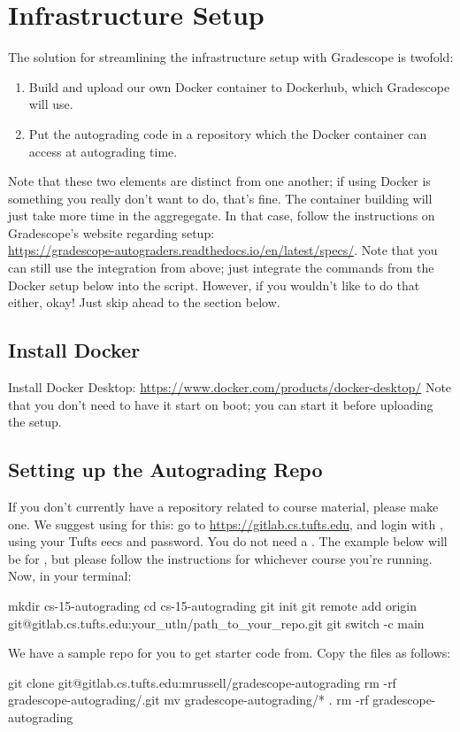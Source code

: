 \documentclass[11pt]{report}
\begin{document}
\chapter*{Infrastructure Setup}
The solution for streamlining the infrastructure setup with Gradescope is twofold:
\begin{enumerate}
      \item Build and upload our own Docker container to Dockerhub, which Gradescope will use.
      \item Put the autograding code in a  repository which the Docker container can access at autograding time. 
\end{enumerate}
Note that these two elements are distinct from one another; if using Docker is something you really don't want to do, that's fine. The container building 
will just take more time in the aggregegate. In that case, follow the instructions on Gradescope's website regarding 
setup:\\ \textcolor{blue}{\href{https://gradescope-autograders.readthedocs.io/en/latest/specs/}{https://gradescope-autograders.readthedocs.io/en/latest/specs/}}.
Note that you can still use the  integration from above; just integrate the  commands 
from the Docker setup below into the  script. However, if you wouldn't like to do that either, okay! Just skip ahead to the  section below. 

\section*{Install Docker}
Install Docker Desktop: \textcolor{blue}{\href{https://www.docker.com/products/docker-desktop/}{https://www.docker.com/products/docker-desktop/}}
Note that you don't need to have it start on boot; you can start it before uploading the setup. 

\section*{Setting up the Autograding Repo}
If you don't currently have a repository related to course material, please make one. We suggest using
 for this: go to \textcolor{blue}{\href{https://gitlab.cs.tufts.edu}{https://gitlab.cs.tufts.edu}}, and 
login with , using your Tufts eecs  and password. You do not need a .
The example below will be for , but please follow the instructions for whichever course you're running.
Now, in your terminal:
\begin{bashcodeblock}
mkdir cs-15-autograding
cd cs-15-autograding
git init
git remote add origin git@gitlab.cs.tufts.edu:your_utln/path_to_your_repo.git
git switch -c main 
\end{bashcodeblock}
We have a sample repo for you to get starter code from. Copy the files as follows:
\begin{bashcodeblock}
git clone git@gitlab.cs.tufts.edu:mrussell/gradescope-autograding
rm -rf gradescope-autograding/.git
mv gradescope-autograding/* .
rm -rf gradescope-autograding
\end{bashcodeblock}
\end{document}
